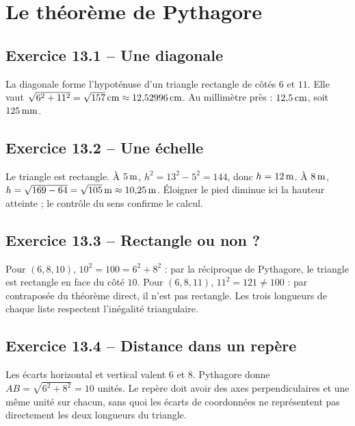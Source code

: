 \chapter{Le théorème de Pythagore}
\label{corriges:13}
\section*{Exercice 13.1 -- Une diagonale}
La diagonale forme l'hypoténuse d'un triangle rectangle de côtés $6$ et $11$. Elle vaut $\sqrt{6^2+11^2}=\sqrt{157}\,\mathrm{cm}\approx12{,}52996\,\mathrm{cm}$. Au millimètre près : $12{,}5\,\mathrm{cm}$, soit $125\,\mathrm{mm}$.

\section*{Exercice 13.2 -- Une échelle}
Le triangle est rectangle. À $5\,\mathrm{m}$, $h^2=13^2-5^2=144$, donc $h=12\,\mathrm{m}$. À $8\,\mathrm{m}$, $h=\sqrt{169-64}=\sqrt{105}\,\mathrm{m}\approx10{,}25\,\mathrm{m}$. Éloigner le pied diminue ici la hauteur atteinte ; le contrôle du sens confirme le calcul.

\section*{Exercice 13.3 -- Rectangle ou non ?}
Pour $(6,8,10)$, $10^2=100=6^2+8^2$ : par la réciproque de Pythagore, le triangle est rectangle en face du côté $10$. Pour $(6,8,11)$, $11^2=121\ne100$ : par contraposée du théorème direct, il n'est pas rectangle. Les trois longueurs de chaque liste respectent l'inégalité triangulaire.

\section*{Exercice 13.4 -- Distance dans un repère}
Les écarts horizontal et vertical valent $6$ et $8$. Pythagore donne $AB=\sqrt{6^2+8^2}=10$ unités. Le repère doit avoir des axes perpendiculaires et une même unité sur chacun, sans quoi les écarts de coordonnées ne représentent pas directement les deux longueurs du triangle.
